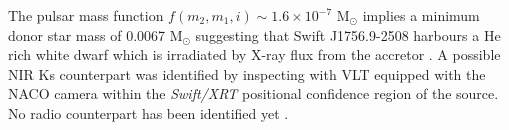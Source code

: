 \documentclass[graybox]{svmult}
\def \swiftxrt{{\em Swift/XRT\xspace}}
\begin{document}
The pulsar mass function $f(m_2,m_1,i)\sim 1.6\times 10^{-7}$ M$_\odot$ implies a minimum donor star mass of 0.0067 M$_\odot$ suggesting that Swift J1756.9-2508 harbours a He rich white dwarf which is irradiated by X-ray flux from the accretor \cite{Krimm2007}. A possible NIR Ks counterpart was identified by inspecting with VLT equipped with the NACO camera within the \swiftxrt{} positional confidence region of the source. No radio counterpart has been identified yet \cite{Possenti2007,Hessels2007}.

\end{document}
